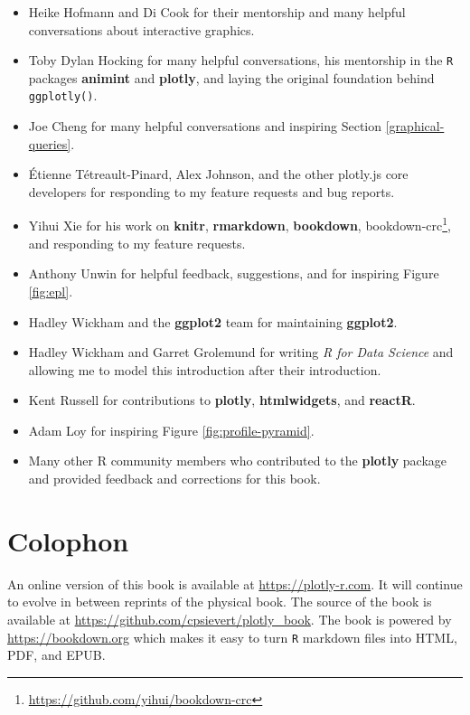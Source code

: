 \documentclass[
  12pt,
]{krantz}
\providecommand{\tightlist}{%
  \setlength{\itemsep}{0pt}\setlength{\parskip}{0pt}}
\renewcommand{\href}[2]{#2\footnote{\url{#1}}}
\begin{document}
\begin{itemize}
\tightlist
\item
  Heike Hofmann and Di Cook for their mentorship and many helpful conversations about interactive graphics.
\item
  Toby Dylan Hocking for many helpful conversations, his mentorship in the \texttt{R} packages \textbf{animint} and \textbf{plotly}, and laying the original foundation behind \texttt{ggplotly()}.
\item
  Joe Cheng for many helpful conversations and inspiring Section \ref{graphical-queries}.
\item
  Étienne Tétreault-Pinard, Alex Johnson, and the other plotly.js core developers for responding to my feature requests and bug reports.
\item
  Yihui Xie for his work on \textbf{knitr}, \textbf{rmarkdown}, \textbf{bookdown}, \href{https://github.com/yihui/bookdown-crc}{bookdown-crc}, and responding to my feature requests.
\item
  Anthony Unwin for helpful feedback, suggestions, and for inspiring Figure \ref{fig:epl}.
\item
  Hadley Wickham and the \textbf{ggplot2} team for maintaining \textbf{ggplot2}.
\item
  Hadley Wickham and Garret Grolemund for writing \emph{R for Data Science} and allowing me to model this introduction after their introduction.
\item
  Kent Russell for contributions to \textbf{plotly}, \textbf{htmlwidgets}, and \textbf{reactR}.
\item
  Adam Loy for inspiring Figure \ref{fig:profile-pyramid}.
\item
  Many other R community members who contributed to the \textbf{plotly} package and provided feedback and corrections for this book.
\end{itemize}

\hypertarget{colophon}{%
\section{Colophon}\label{colophon}}

An online version of this book is available at \url{https://plotly-r.com}. It will continue to evolve in between reprints of the physical book. The source of the book is available at \url{https://github.com/cpsievert/plotly_book}. The book is powered by \url{https://bookdown.org} which makes it easy to turn \texttt{R} markdown files into HTML, PDF, and EPUB.
\end{document}
